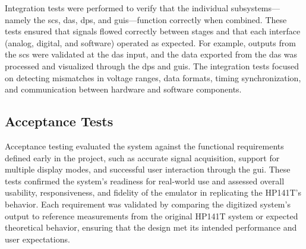 \documentclass[class=report,11pt,crop=false]{standalone}
\begin{document}
	Integration tests were performed to verify that the individual subsystems—namely the \acrshort{scs}, \acrshort{das}, \acrshort{dps}, and \acrshort{guis}—function correctly when combined. These tests ensured that signals flowed correctly between stages and that each interface (analog, digital, and software) operated as expected. For example, outputs from the \acrshort{scs} were validated at the \acrshort{das} input, and the data exported from the \acrshort{das} was processed and visualized through the \acrshort{dps} and \acrshort{guis}. The integration tests focused on detecting mismatches in voltage ranges, data formats, timing synchronization, and communication between hardware and software components.
	
	\subsection{Acceptance Tests} 
	
	Acceptance testing evaluated the system against the functional requirements defined early in the project, such as accurate signal acquisition, support for multiple display modes, and successful user interaction through the \acrshort{gui}. These tests confirmed the system's readiness for real-world use and assessed overall usability, responsiveness, and fidelity of the emulator in replicating the HP141T’s behavior. Each requirement was validated by comparing the digitized system's output to reference measurements from the original HP141T system or expected theoretical behavior, ensuring that the design met its intended performance and user expectations.
	\ifstandalone
	
	\printnoidxglossary[type=\acronymtype,nonumberlist]
	\fi
\end{document}
